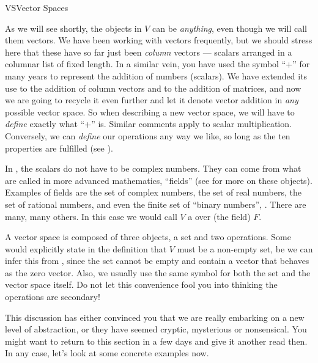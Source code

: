 \begin{subsect}{VS}{Vector Spaces}
%
\begin{para}As we will see shortly, the objects in $V$ can be {\em anything}, even though we will call them vectors.  We have been working with vectors frequently, but we should stress here that these have so far just been {\em column} vectors --- scalars arranged in a columnar list of fixed length.  In a similar vein, you have used the symbol ``+'' for many years to represent the addition of numbers (scalars).  We have extended its use to the addition of column vectors and to the addition of matrices, and now we are going to recycle it even further and let it denote vector addition in {\em any} possible vector space.  So when describing a new vector space, we will have to {\em define} exactly what ``+'' is.  Similar comments apply to scalar multiplication.  Conversely, we can {\em define} our operations any way we like, so long as the ten properties are fulfilled (see ).\end{para}
%
\begin{para}In , the scalars do not have to be complex numbers.  They can come from what are called in more advanced mathematics, ``fields'' (see  for more on these objects).  Examples of fields are the set of complex numbers, the set of real numbers, the set of rational numbers, and even the finite set of ``binary numbers'', .  There are many, many others.  In this case we would call $V$ a  over (the field) $F$.\end{para}
%
\begin{para}A vector space is composed of three objects, a set and two operations.  Some would explicitly state in the definition that $V$ must be a non-empty set, be we can infer this from , since the set cannot be empty and contain a vector that behaves as the zero vector.  Also, we usually use the same symbol for both the set and the vector space itself.  Do not let this convenience fool you into thinking the operations are secondary!\end{para}
%
\begin{para}This discussion has either convinced you that we are really embarking on a new level of abstraction, or they have seemed cryptic, mysterious or nonsensical.  You might want to return to this section in a few days and give it another read then.  In any case, let's look at some concrete examples now.\end{para}
%
\end{subsect}
